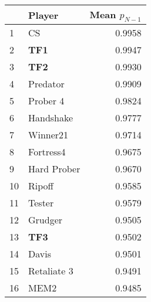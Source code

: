\begin{tabular}{llr}
\toprule
{} &       Player &  Mean $p_{N-1}$ \\
\midrule
1  &           CS &          0.9958 \\
2  &          \textbf{TF1} &          0.9947 \\
3  &          \textbf{TF2} &          0.9930 \\
4  &     Predator &          0.9909 \\
5  &     Prober 4 &          0.9824 \\
6  &    Handshake &          0.9777 \\
7  &     Winner21 &          0.9714 \\
8  &    Fortress4 &          0.9675 \\
9  &  Hard Prober &          0.9670 \\
10 &       Ripoff &          0.9585 \\
11 &       Tester &          0.9579 \\
12 &      Grudger &          0.9505 \\
13 &          \textbf{TF3} &          0.9502 \\
14 &        Davis &          0.9501 \\
15 &  Retaliate 3 &          0.9491 \\
16 &         MEM2 &          0.9485 \\
\bottomrule
\end{tabular}
